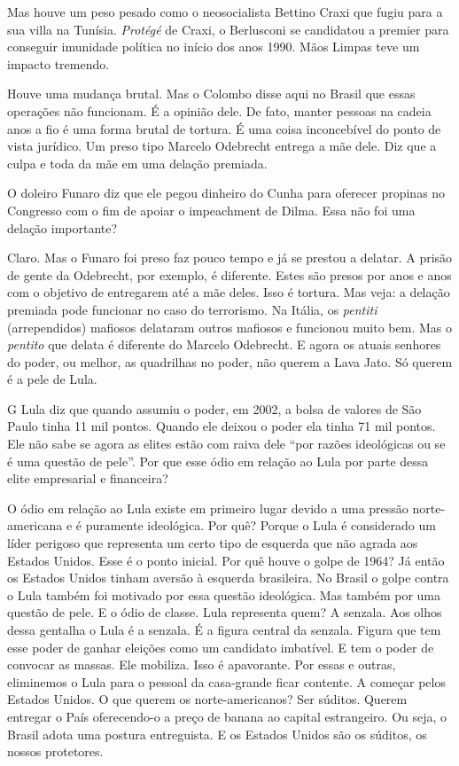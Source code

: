  Mas houve um peso pesado como o neosocialista Bettino Craxi que fugiu
para a sua villa na Tunísia. \emph{Protégé} de Craxi, o Berlusconi se
candidatou a premier para conseguir imunidade política no início dos
anos 1990. Mãos Limpas teve um impacto tremendo.

 Houve uma mudança brutal. Mas o Colombo disse aqui no Brasil que
essas operações não funcionam. É a opinião dele. De fato, manter pessoas
na cadeia anos a fio é uma forma brutal de tortura. É uma coisa
inconcebível do ponto de vista jurídico. Um preso tipo Marcelo Odebrecht
entrega a mãe dele. Diz que a culpa e toda da mãe em uma delação
premiada.

 O doleiro Funaro diz que ele pegou dinheiro do Cunha para oferecer
propinas no Congresso com o fim de apoiar o impeachment de Dilma. Essa
não foi uma delação importante?

 Claro. Mas o Funaro foi preso faz pouco tempo e já se prestou a
delatar. A prisão de gente da Odebrecht, por exemplo, é diferente. Estes
são presos por anos e anos com o objetivo de entregarem até a mãe deles.
Isso é tortura. Mas veja: a delação premiada pode funcionar no caso do
terrorismo. Na Itália, os \emph{pentiti} (arrependidos) mafiosos
delataram outros mafiosos e funcionou muito bem. Mas o \emph{pentito}
que delata é diferente do Marcelo Odebrecht. E agora os atuais senhores
do poder, ou melhor, as quadrilhas no poder, não querem a Lava Jato. Só
querem é a pele de Lula.

G Lula diz que quando assumiu o poder, em 2002, a bolsa de valores de
São Paulo tinha 11 mil pontos. Quando ele deixou o poder ela tinha 71
mil pontos. Ele não sabe se agora as elites estão com raiva dele ``por
razões ideológicas ou se é uma questão de pele''. Por que esse ódio em
relação ao Lula por parte dessa elite empresarial e financeira?

 O ódio em relação ao Lula existe em primeiro lugar devido a uma
pressão norte-americana e é puramente ideológica.
Por quê? Porque o Lula é
considerado um líder perigoso que representa um certo tipo de esquerda
que não agrada aos Estados Unidos. Esse é o ponto inicial. Por quê houve
o golpe de 1964? Já então os Estados Unidos tinham aversão à esquerda
brasileira. No Brasil o golpe contra o Lula também foi motivado por essa
questão ideológica. Mas também por uma questão de pele. E o ódio de
classe. Lula representa quem? A senzala. Aos olhos dessa gentalha o Lula
é a senzala. É a figura central da senzala. Figura que tem esse poder de
ganhar eleições como um candidato imbatível. E tem o poder de convocar
as massas. Ele mobiliza. Isso é apavorante. Por essas e outras,
eliminemos o Lula para o pessoal da casa-grande ficar contente. A
começar pelos Estados Unidos. O que querem os norte-americanos? Ser
súditos. Querem entregar o País oferecendo-o a preço de banana ao
capital estrangeiro. Ou seja, o Brasil adota uma postura entreguista. E
os Estados Unidos são os súditos, os nossos protetores.

